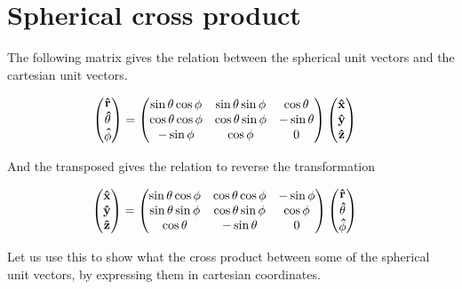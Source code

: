 \documentclass[x11names]{article}
\begin{document}
\section{Spherical cross product}
    \label{sec:cross}
    The following matrix gives the relation between the spherical unit vectors and the cartesian unit vectors. 

    \begin{align}
      \begin{pmatrix}
        \vu{r} \\ \vu{\theta} \\ \vu{\phi}
      \end{pmatrix}
      &= 
      \begin{pmatrix}
        \sin\theta\cos\phi & \sin\theta\sin\phi & \cos\theta
        \\
        \cos\theta\cos\phi & \cos\theta\sin\phi & -\sin\theta
        \\
        -\sin\phi & \cos\phi & 0
      \end{pmatrix}
      \begin{pmatrix}
        \vu{x} \\ \vu{y} \\ \vu{z}
      \end{pmatrix}
    \end{align}

    And the transposed gives the relation to reverse the transformation

    \begin{align}
      \begin{pmatrix}
        \vu{x} \\ \vu{y} \\ \vu{z}
      \end{pmatrix}
      &= 
      \begin{pmatrix}
        \sin\theta\cos\phi & \cos\theta\cos\phi & -\sin\phi
        \\
        \sin\theta\sin\phi & \cos\theta\sin\phi & \cos\phi
        \\
        \cos\theta         &  -\sin\theta & 0
      \end{pmatrix}
      \begin{pmatrix}
        \vu{r} \\ \vu{\theta} \\ \vu{\phi}
      \end{pmatrix}
    \end{align}

    Let us use this to show what the cross product between some of the spherical unit vectors, by expressing them in cartesian coordinates.
\end{document}
